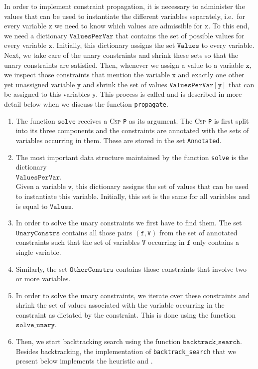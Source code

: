 In order to implement constraint propagation, it is necessary to administer the values that can be used
to instantiate the different variables separately, i.e.~for every variable $\texttt{x}$ we need to know which
values are admissible for $\texttt{x}$.  To this end, we need a dictionary $\texttt{ValuesPerVar}$ that
contains the set of possible values for every variable $\texttt{x}$.  Initially, this dictionary assigns the
set $\texttt{Values}$ to every variable.  Next, we take care of the unary constraints and shrink these sets so
that the unary constraints are satisfied.  Then, whenever we assign a value to a variable $\texttt{x}$,  we
inspect those constraints that mention the variable $\texttt{x}$ and exactly one other yet unassigned variable
$\texttt{y}$ and shrink the set of values $\texttt{ValuesPerVar}[\texttt{y}]$ that can be assigned to this
variables $\texttt{y}$.  This process is called  and is described in more detail
below when we discuss the function \texttt{propagate}.
\begin{enumerate}
\item The function $\texttt{solve}$ receives a \textsc{Csp} \texttt{P} as its argument.  
      The \textsc{Csp} \texttt{P} is first split into its
      three components and the constraints are annotated with the sets of variables occurring in them.
      These  are stored in the set \texttt{Annotated}.
\item The most important data structure maintained by the function \texttt{solve} is the dictionary
      \\[0.2cm]
      \hspace*{1.3cm}
      $\texttt{ValuesPerVar}$.  
      \\[0.2cm]
      Given a variable $\texttt{v}$, this dictionary assigns the set of values that can be used to instantiate this
      variable.  Initially, this set is the same for all variables and is equal to $\texttt{Values}$.
\item In order to solve the unary constraints we first have to find them.
      The set $\texttt{UnaryConstrs}$ contains all those pairs $(\texttt{f}, \texttt{V})$ from the set of
      annotated constraints such that the set of variables $\texttt{V}$ occurring in $\mathtt{f}$ only contains a
      single variable. 
\item Similarly, the set $\texttt{OtherConstrs}$ contains those constraints that involve two or more variables.
\item In order to solve the unary constraints, we iterate over these constraints and shrink the set of
      values associated with the variable occurring in the constraint as dictated by the constraint.
      This is done using the function $\texttt{solve\_unary}$.
\item Then, we start backtracking search using the function $\texttt{backtrack\_search}$.  
      Besides backtracking, the implementation of \texttt{backtrack\_search} that we present below
      implements the  heuristic and .
\end{enumerate}

